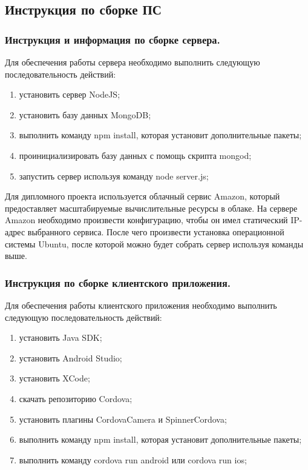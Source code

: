 \subsection{Инструкция по сборке ПС}
\label{sub:arch_and_mod:sbor}

\subsubsection{Инструкция и информация по сборке сервера. }


Для обеспечения работы сервера необходимо выполнить следующую последовательность действий:
\begin{enumerate}
\item установить сервер NodeJS;
\item установить базу данных MongoDB;
\item выполнить команду npm install, которая установит дополнительные пакеты;
\item проинициализировать базу данных с помощь скрипта mongod;
\item запустить сервер используя команду node server.js;
\end{enumerate}

Для дипломного проекта используется облачный сервис Amazon, который предоставляет масштабируемые вычислительные ресурсы в облаке. На сервере Amazon необходимо произвести конфигурацию, чтобы он имел статический IP-адрес выбранного сервиса. После чего произвести установка операционной системы Ubuntu, после которой можно будет собрать сервер используя команды выше.

\subsubsection{Инструкция по сборке клиентского приложения. }


Для обеспечения работы клиентского приложения необходимо выполнить следующую последовательность действий:
\begin{enumerate}
\item установить Java SDK;
\item установить Android Studio;
\item установить XCode;
\item скачать репозиторию Cordova;
\item установить плагины CordovaCamera и SpinnerCordova;
\item выполнить команду npm install, которая установит дополнительные пакеты;
\item выполнить команду cordova run android или cordova run ios;
\end{enumerate}